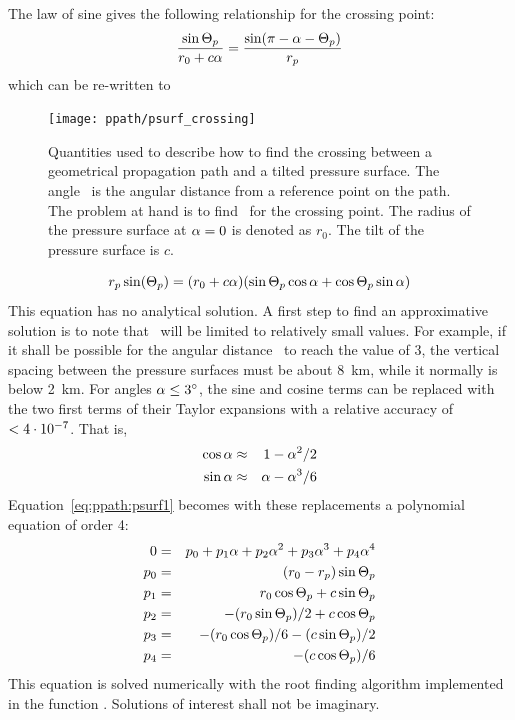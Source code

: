 The law of sine gives the following relationship for the crossing
point:
\begin{equation}
  \frac{\sin\Theta_p}{r_{0}+c\alpha} = 
                                \frac{\sin(\pi-\alpha-\Theta_p)}{r_{p}}
\end{equation}
which can be re-written to

\begin{figure}
 \begin{minipage}[c]{0.45\textwidth}
 \texttt{[image: ppath/psurf\_crossing]}
 \end{minipage}%
 \begin{minipage}[c]{0.55\textwidth}
  \caption{Quantities used to describe how to find the crossing between a 
    geometrical propagation path and a tilted pressure surface. The
    angle \Lat\ is the angular distance from a reference point on the
    path. The problem at hand is to find \Lat\ for the crossing
    point. The radius of the pressure surface at $\alpha = 0$ is
    denoted as $r_0$. The tilt of the pressure surface is $c$.}
  \label{fig:ppath:psurf_crossing}
 \end{minipage}%
\end{figure}   

\begin{equation}
   r_{p} \sin(\Theta_p) = (r_{0}+c\alpha) 
           (\sin\Theta_p \cos\alpha + \cos\Theta_p \sin\alpha)
 \label{eq:ppath:psurf1}
\end{equation}
This equation has no analytical solution. A first step to find an
approximative solution is to note that \Lat\ will be limited to
relatively small values. For example, if it shall be possible for the
angular distance \Lat\ to reach the value of 3\degree, the vertical
spacing between the pressure surfaces must be about 8~km, while it
normally is below 2~km. For angles $\alpha \leq 3^\circ$, the sine and
cosine terms can be replaced with the two first terms of their Taylor
expansions with a relative accuracy of $< 4\cdot10^{-7}$. That is,
\begin{eqnarray}
  \cos \alpha & \approx & 1 - \alpha^2 / 2    \nonumber \\
  \sin \alpha & \approx & \alpha - \alpha^3 / 6 \nonumber
\end{eqnarray}
Equation~\ref{eq:ppath:psurf1} becomes with these replacements a
polynomial equation of order 4:
\begin{eqnarray}
  \label{eq:ppath:psurf2}
  0 & = & p_0 + p_1 \alpha + p_2 \alpha^2 + p_3 \alpha^3 + p_4 \alpha^4 \\
  p_0 & = & (r_{0}-r_{p}) \sin\Theta_p \nonumber \\ 
  p_1 & = & r_{0}\cos\Theta_p + c \sin\Theta_p \nonumber \\ 
  p_2 & = & -(r_{0}\sin\Theta_p)/2 + c\cos\Theta_p  \nonumber \\ 
  p_3 & = & -(r_{0}\cos\Theta_p)/6 - (c\sin\Theta_p)/2 \nonumber \\ 
  p_4 & = & -(c \cos\Theta_p)/6  \nonumber 
\end{eqnarray}
This equation is solved numerically with the root finding algorithm
implemented in the function . Solutions of
interest shall not be imaginary.

